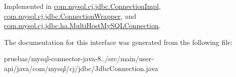Implemented in \mbox{\hyperlink{classcom_1_1mysql_1_1cj_1_1jdbc_1_1_connection_impl_ad33978512e58f5bb84875219ffd8af41}{com.\+mysql.\+cj.\+jdbc.\+Connection\+Impl}}, \mbox{\hyperlink{classcom_1_1mysql_1_1cj_1_1jdbc_1_1_connection_wrapper_a0989b3c99444046219ef68a1e15863c9}{com.\+mysql.\+cj.\+jdbc.\+Connection\+Wrapper}}, and \mbox{\hyperlink{classcom_1_1mysql_1_1cj_1_1jdbc_1_1ha_1_1_multi_host_my_s_q_l_connection_a33803a0494610eb6148a4d8c1c9b046a}{com.\+mysql.\+cj.\+jdbc.\+ha.\+Multi\+Host\+My\+S\+Q\+L\+Connection}}.



The documentation for this interface was generated from the following file\+:\begin{DoxyCompactItemize}
\item 
pruebas/mysql-\/connector-\/java-\/8../src/main/user-\/api/java/com/mysql/cj/jdbc/Jdbc\+Connection.\+java\end{DoxyCompactItemize}
